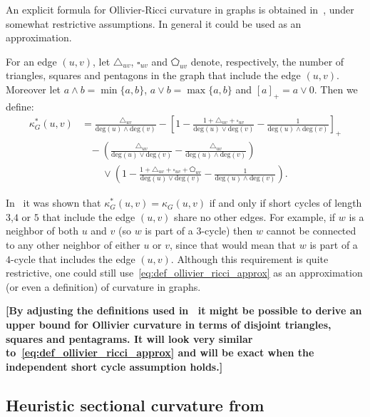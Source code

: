 \documentclass{article}
\begin{document}
An explicit formula for Ollivier-Ricci curvature in graphs is obtained in~\cite{kelly2019self}, under somewhat restrictive assumptions. In general it could be used as an approximation.

For an edge $(u,v)$, let $\triangle_{uv}$, $\square_{uv}$ and $\pentagon_{uv}$ denote, respectively, the number of triangles, squares and pentagons in the graph that include the edge $(u,v)$. Moreover let $a \wedge b = \min\{a,b\}$, $a \vee b = \max\{a,b\}$ and $[a]_+ = a \vee 0$. Then we define:
\begin{equation}\label{eq:def_ollivier_ricci_approx}
	\begin{aligned}
		\kappa_G^\ast(u,v) &= \frac{\triangle_{uv}}{\mathrm{deg}(u) \wedge \mathrm{deg}(v)} 
			- \left[1 - \frac{1 + \triangle_{uv} + \square_{uv}}{\mathrm{deg}(u) \vee \mathrm{deg}(v)} - \frac{1}{\mathrm{deg}(u) \wedge \mathrm{deg}(v)}\right]_+\\
		&\hspace{10pt}- \left(\frac{\triangle_{uv}}{\mathrm{deg}(u) \vee \mathrm{deg}(v)} 
			- \frac{\triangle_{uv}}{\mathrm{deg}(u) \wedge \mathrm{deg}(v)}\right)\\
		&\hspace{25pt}\vee \left(1 - \frac{1 + \triangle_{uv} + \square_{uv} + \pentagon_{uv}}
			{\mathrm{deg}(u) \vee \mathrm{deg}(v)}
			- \frac{1}{\mathrm{deg}(u) \wedge \mathrm{deg}(v)}\right).
	\end{aligned}	
\end{equation}

In~\cite{kelly2019self} it was shown that $\kappa_G^\ast(u,v) = \kappa_G(u,v)$ if and only if short cycles of length $3$,$4$ or $5$ that include the edge $(u,v)$ share no other edges. For example, if $w$ is a neighbor of both $u$ and $v$ (so $w$ is part of a $3$-cycle) then $w$ cannot be connected to any other neighbor of either $u$ or $v$, since that would mean that $w$ is part of a $4$-cycle that includes the edge $(u,v)$. Although this requirement is quite restrictive, one could still use~\eqref{eq:def_ollivier_ricci_approx} as an approximation (or even a definition) of curvature in graphs.

{\bf [By adjusting the definitions used in~\cite{kelly2019self} it might be possible to derive an upper bound for Ollivier curvature in terms of disjoint triangles, squares and pentagrams. It will look very similar to~\eqref{eq:def_ollivier_ricci_approx} and will be exact when the independent short cycle assumption holds.]}

\subsection{Heuristic sectional curvature from~\cite{gu2019learning}}
\end{document}
